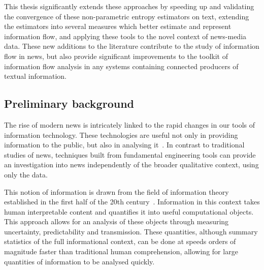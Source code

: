 This thesis significantly extends these approaches by speeding up and validating the convergence of these non-parametric entropy estimators on text, extending the estimators into several measures which better estimate and represent information flow, and applying these tools to the novel context of news-media data. These new additions to the literature contribute to the study of information flow in news, but also provide significant improvements to the toolkit of information flow analysis in any systems containing connected producers of textual information.


\subsection{Preliminary background}

The rise of modern news is intricately linked to the rapid changes in our tools of information technology. These technologies are useful not only in providing information to the public, but also in analysing it~\cite{shannon_mathematical_1948,cover_elements_2012}. In contrast to traditional studies of news, techniques built from fundamental engineering tools can provide an investigation into news independently of the broader qualitative context, using only the data.   

This notion of information is drawn from the field of information theory established in the first half of the 20th century~\cite{shannon_mathematical_1948,nyquist1924certain,hartley1928transmission}. Information in this context takes human interpretable content and quantifies it into useful computational objects. This approach allows for an analysis of these objects through measuring uncertainty, predictability and transmission. These quantities, although summary statistics of the full informational context, can be done at speeds orders of magnitude faster than traditional human comprehension, allowing for large quantities of information to be analysed quickly. 

